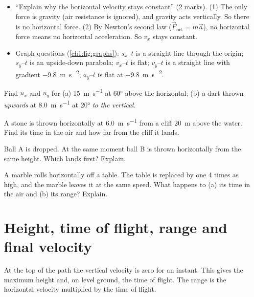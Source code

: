 \begin{examtip}
\begin{itemize}
  \item ``Explain why the horizontal velocity stays constant'' (2 marks).
        (1) The only force is gravity (air resistance is ignored), and gravity acts vertically.
        So there is no horizontal force. (2) By Newton's second law
        ($\vec{F}_\mathrm{net} = m\vec{a}$), no horizontal force means no horizontal
        acceleration. So $v_x$ stays constant.
  \item Graph questions (\cref{ch1:fig:graphs}): $s_x$--$t$ is a straight line through the
        origin; $s_y$--$t$ is an upside-down parabola; $v_x$--$t$ is flat; $v_y$--$t$ is a
        straight line with gradient \qty{-9.8}{m.s^{-2}}; $a_y$--$t$ is flat at
        \qty{-9.8}{m.s^{-2}}.
\end{itemize}
\end{examtip}

\begin{quickcheck}
  \item Find $u_x$ and $u_y$ for (a) \qty{15}{m.s^{-1}} at \ang{60} above the horizontal;
        (b) a dart thrown \emph{upwards} at \qty{8.0}{m.s^{-1}} at \ang{20} \emph{to the vertical}.
  \item A stone is thrown horizontally at \qty{6.0}{m.s^{-1}} from a cliff \qty{20}{m}
        above the water. Find its time in the air and how far from the cliff it lands.
  \item Ball A is dropped. At the same moment ball B is thrown horizontally from the same
        height. Which lands first? Explain.
  \item A marble rolls horizontally off a table. The table is replaced by one 4 times as high,
        and the marble leaves it at the same speed. What happens to (a) its time in the air and
        (b) its range? Explain.
\end{quickcheck}

\section{Height, time of flight, range and final velocity}\label{ch1:sec:height}

\begin{bigidea}
At the top of the path the vertical velocity is zero for an instant. This gives the
maximum height and, on level ground, the time of flight. The range is the horizontal
velocity multiplied by the time of flight.
\end{bigidea}

